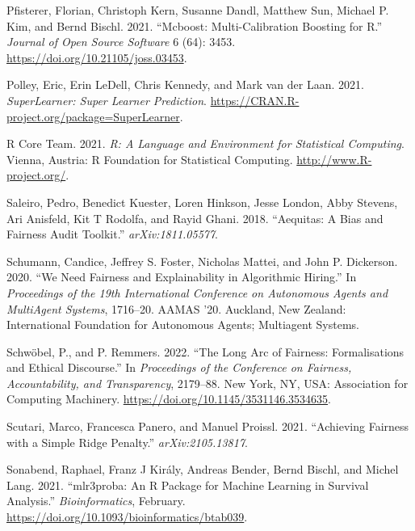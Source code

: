\begin{CSLReferences}{1}{0}
\leavevmode{}%
Pfisterer, Florian, Christoph Kern, Susanne Dandl, Matthew Sun, Michael P. Kim, and Bernd Bischl. 2021. {``Mcboost: Multi-Calibration Boosting for {R}.''} \emph{Journal of Open Source Software} 6 (64): 3453. \url{https://doi.org/10.21105/joss.03453}.

\leavevmode{}%
Polley, Eric, Erin LeDell, Chris Kennedy, and Mark van der Laan. 2021. \emph{SuperLearner: Super Learner Prediction}. \url{https://CRAN.R-project.org/package=SuperLearner}.

\leavevmode{}%
R Core Team. 2021. \emph{R: A Language and Environment for Statistical Computing}. Vienna, Austria: R Foundation for Statistical Computing. \url{http://www.R-project.org/}.

\leavevmode{}%
Saleiro, Pedro, Benedict Kuester, Loren Hinkson, Jesse London, Abby Stevens, Ari Anisfeld, Kit T Rodolfa, and Rayid Ghani. 2018. {``Aequitas: A Bias and Fairness Audit Toolkit.''} \emph{arXiv:1811.05577}.

\leavevmode{}%
Schumann, Candice, Jeffrey S. Foster, Nicholas Mattei, and John P. Dickerson. 2020. {``We Need Fairness and Explainability in Algorithmic Hiring.''} In \emph{Proceedings of the 19th International Conference on Autonomous Agents and MultiAgent Systems}, 1716--20. AAMAS '20. Auckland, New Zealand: International Foundation for Autonomous Agents; Multiagent Systems.

\leavevmode{}%
Schwöbel, P., and P. Remmers. 2022. {``The Long Arc of Fairness: Formalisations and Ethical Discourse.''} In \emph{Proceedings of the Conference on Fairness, Accountability, and Transparency}, 2179--88. New York, NY, USA: Association for Computing Machinery. \url{https://doi.org/10.1145/3531146.3534635}.

\leavevmode{}%
Scutari, Marco, Francesca Panero, and Manuel Proissl. 2021. {``Achieving Fairness with a Simple Ridge Penalty.''} \emph{arXiv:2105.13817}.

\leavevmode{}%
Sonabend, Raphael, Franz J Király, Andreas Bender, Bernd Bischl, and Michel Lang. 2021. {``{mlr3proba: An {R} Package for Machine Learning in Survival Analysis}.''} \emph{Bioinformatics}, February. \url{https://doi.org/10.1093/bioinformatics/btab039}.


\end{CSLReferences}
